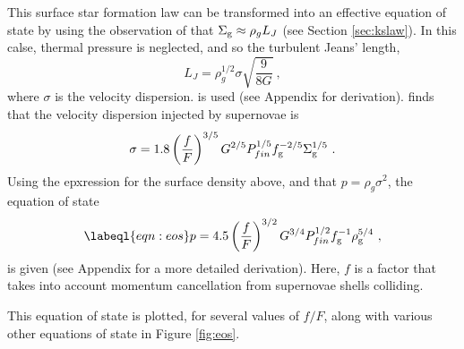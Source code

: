 This surface star formation law can be transformed into an effective equation of state by using the observation of \citet{schaye2004} that $\Sigma_\mathrm{g} \approx \rho_g L_J$ (see Section \ref{sec:kslaw}).
In this calse, thermal pressure is neglected, and so the turbulent Jeans' length,
\begin{equation}
\label{eqn:jeans}
L_J = \rho_g^{1/2} \sigma \sqrt{\frac{9}{8G}}~,
\end{equation}
where $\sigma$ is the velocity dispersion.
is used (see Appendix for derivation).
\citet{martissi2015} finds that the velocity dispersion injected by supernovae is
\begin{equation}
\label{eqn:martdisp}
\sigma = 1.8 \left(\frac{f}{F}\right)^{{3/5}} G^{{2/5}} P_{fin}^{{1/5}} f_\mathrm{g}^{{-2/5}} \Sigma_\mathrm{g}^{{1/5}}~.
\end{equation}
Using the epxression for the surface density above, and that $p = \rho_g \sigma^2$, the equation of state
\begin{equation}
\labeql{eqn:eos}
p = 4.5\left(\frac{f}{F}\right)^{{3/2}} G^{{3/4}} P_{fin}^{{1/2}} \fgas^{-1} \rho_\mathrm{g}^{{5/4}}~,
\end{equation}
is given (see Appendix for a more detailed derivation).
Here, $f$ is a factor that takes into account momentum cancellation from supernovae shells colliding.

This equation of state is plotted, for several values of $f/F$, along with various other equations of state in Figure \ref{fig:eos}.

